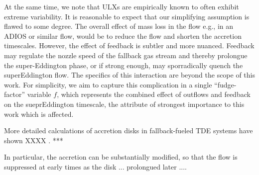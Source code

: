 At the same time, we note that ULXs are empirically known to often exhibit extreme variability.  It is reasonable to expect that our simplifying assumption is flawed to some degree.  The overall effect of mass loss in the flow e.g., in an ADIOS \citep{Begelman??} or similar flow, would be to reduce the flow and shorten the accretion timescales.  However, the effect of feedback is subtler and more nuanced.  Feedback may regulate the nozzle speed of the fallback gas stream and thereby prolongue the super-Eddington phase, or if strong enough, may sporradically quench the superEddington flow.  The specifics of this interaction are beyond the scope of this work.  For simplicity, we aim to capture this complication in a single ``fudge-factor'' variable $f$, which represents the combined effect of outflows and feedback on the sueprEddington timescale, the attribute of strongest importance to this work which is affected.  

 More detailed calculations of accretion disks in fallback-fueled TDE systems have shown XXXX \citep{Shen_2014,Coughlin_2014}.  *** 

In particular, the accretion can be substantially modified, so that the flow is suppressed at early times as the disk ... prolongued later .... 







